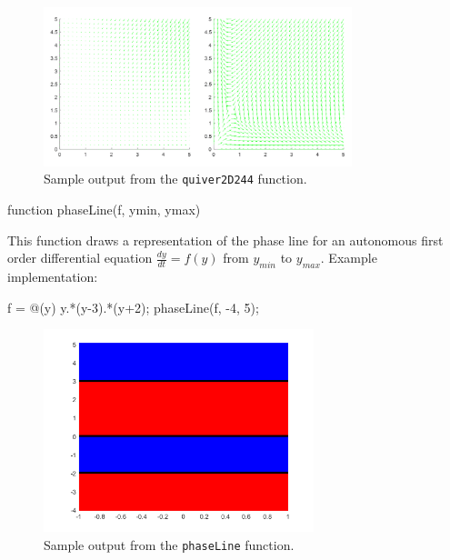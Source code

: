 \begin{figure}[h!]
    \centering
    \includegraphics[width=0.8\textwidth]{Images/MatlabDemo_quiv2D.png}
    \caption{Sample output from the \texttt{quiver2D244} function.}
    \label{fig:MatlabDemo_Quiv2d}
\end{figure}

\begin{matlab}
function phaseLine(f, ymin, ymax)
\end{matlab}

This function draws a representation of the phase line for an autonomous first order differential equation $\frac{dy}{dt} = f(y)$ from $y_{min}$ to $y_{max}$. Example implementation:
\begin{matlab}
f = @(y) y.*(y-3).*(y+2);
phaseLine(f, -4, 5);
\end{matlab}

\begin{figure}[h!]
    \centering
    \includegraphics[width=0.7\textwidth]{Images/MatlabDemo_phaseLine.png}
    \caption{Sample output from the \texttt{phaseLine} function.}
    \label{fig:MatlabDemo_phaseLine}
\end{figure}

